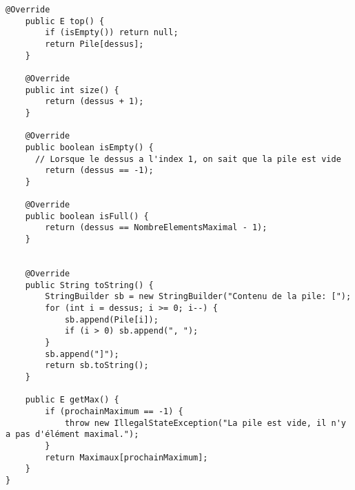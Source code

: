 \documentclass[9pt]{report}
\begin{document}
\begin{lstlisting}[style=JavaDraculaWhite]
    @Override
    public E top() {
        if (isEmpty()) return null;
        return Pile[dessus];
    }

    @Override
    public int size() {
        return (dessus + 1);
    }

    @Override
    public boolean isEmpty() {
      // Lorsque le dessus a l'index 1, on sait que la pile est vide
        return (dessus == -1);
    }

    @Override 
    public boolean isFull() {
        return (dessus == NombreElementsMaximal - 1);
    }


    @Override
    public String toString() {
        StringBuilder sb = new StringBuilder("Contenu de la pile: [");
        for (int i = dessus; i >= 0; i--) {
            sb.append(Pile[i]);
            if (i > 0) sb.append(", ");
        }
        sb.append("]");
        return sb.toString();
    }

    public E getMax() {
        if (prochainMaximum == -1) {
            throw new IllegalStateException("La pile est vide, il n'y a pas d'élément maximal.");
        }
        return Maximaux[prochainMaximum];
    }  
}
      
    \end{lstlisting}














\end{document}
